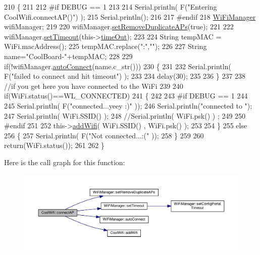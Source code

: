 \begin{DoxyCode}
210 \{
211 
212 \textcolor{preprocessor}{#if DEBUG == 1 }
213     
214     Serial.println( F(\textcolor{stringliteral}{"Entering CoolWifi.connectAP()"}) );   
215     Serial.println();
216 
217 \textcolor{preprocessor}{#endif}
218     \hyperlink{class_wi_fi_manager}{WiFiManager} wifiManager;
219     
220     wifiManager.\hyperlink{class_wi_fi_manager_a4dd1dbf4f22900f226a3897b88155212}{setRemoveDuplicateAPs}(\textcolor{keyword}{true});
221 
222     wifiManager.\hyperlink{class_wi_fi_manager_aa6493d59c284ff245edb767ff684756d}{setTimeout}(this->\hyperlink{class_cool_wifi_a952111605f25156588b5632caaba1c6f}{timeOut});
223     
224     String tempMAC = WiFi.macAddress();
225     tempMAC.replace(\textcolor{stringliteral}{":"},\textcolor{stringliteral}{""});
226 
227     String name=\textcolor{stringliteral}{"CoolBoard-"}+tempMAC;   
228 
229     \textcolor{keywordflow}{if}(!wifiManager.\hyperlink{class_wi_fi_manager_ae3cdfa6b02edcfe63d7da4f696b62136}{autoConnect}(name.c\_str())) 
230     \{
231 
232         Serial.println( F(\textcolor{stringliteral}{"failed to connect and hit timeout"}) );
233 
234         delay(30);
235 
236     \} 
237 
238     \textcolor{comment}{//if you get here you have connected to the WiFi}
239 
240     \textcolor{keywordflow}{if}(WiFi.status()==WL\_CONNECTED)
241     \{
242 
243 \textcolor{preprocessor}{    #if DEBUG == 1}
244 
245         Serial.println( F(\textcolor{stringliteral}{"connected...yeey :)"} ));
246         Serial.println(\textcolor{stringliteral}{"connected to "});
247         Serial.println( WiFi.SSID() );
248         \textcolor{comment}{//Serial.println( WiFi.psk() ) ;}
249         
250 \textcolor{preprocessor}{    #endif}
251 
252         this->\hyperlink{class_cool_wifi_a914d7a1df14dd6b75345fb614c34e9d6}{addWifi}( WiFi.SSID() , WiFi.psk() );
253         
254     \}
255     \textcolor{keywordflow}{else}
256     \{
257         Serial.println( F(\textcolor{stringliteral}{"Not connected...:("} ));
258     \}
259     
260     \textcolor{keywordflow}{return}(WiFi.status());
261 
262 \}
\end{DoxyCode}
Here is the call graph for this function\+:\nopagebreak
\begin{figure}[H]
\begin{center}
\leavevmode
\includegraphics[width=350pt]{d7/d29/class_cool_wifi_a7c857f27161782f5ef1d62d552aff971_cgraph}
\end{center}
\end{figure}
